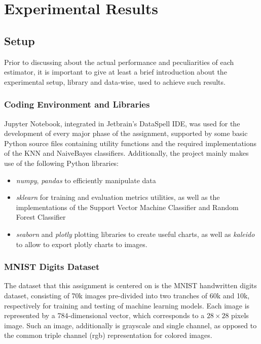 \chapter{Experimental Results}\label{exp_results_chapter}

\section{Setup}

Prior to discussing about the actual performance and peculiarities of each estimator, it is important to give at least a brief introduction about the experimental setup, library and data-wise, used to achieve such results.

\subsection{Coding Environment and Libraries}

Jupyter Notebook, integrated in Jetbrain's DataSpell IDE, was used for the development of every major phase of the assignment, supported by some basic Python source files containing utility functions and the required implementations of the KNN and NaiveBayes classifiers.
Additionally, the project mainly makes use of the following Python libraries:

\begin{itemize}
    \item \textit{numpy}, \textit{pandas} to efficiently manipulate data

    \item \textit{sklearn} for training and evaluation metrics utilities, as well as the implementations of the Support Vector Machine Classifier and Random Forest Classifier

    \item \textit{seaborn} and \textit{plotly} plotting libraries to create useful charts, as well as \textit{kaleido} to allow to export plotly charts to images.
\end{itemize}


\subsection{MNIST Digits Dataset}

The dataset that this assignment is centered on is the MNIST handwritten digits dataset, consisting of 70k images pre-divided into two tranches of 60k and 10k, respectively for training and testing of machine learning models. Each image is represented by a 784-dimensional vector, which corresponds to a $28 \times 28$ pixels image. Such an image, additionally is grayscale and single channel, as opposed to the common triple channel (rgb) representation for colored images.

